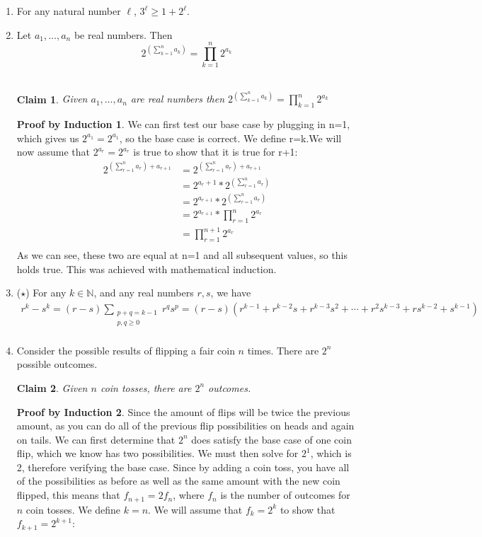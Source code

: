 \documentclass[11pt]{letter}
\newtheorem{claim}{Claim}
\theoremstyle{definition}
\newtheorem{PBI}{Proof by Induction}
\begin{document}
\begin{description}
\begin{enumerate}
			\item For any natural number $\ell$, $3^\ell\geq 1+2^\ell$.
			\item Let $a_1,\ldots, a_n$ be real numbers. Then
				$$2^{\left(\sum_{k=1}^n a_k\right)}=\prod_{k=1}^n 2^{a_k}$$ \\
\begin{claim}
Given $a_1,\ldots, a_n$ are real numbers then $2^{\left(\sum_{k=1}^n a_k\right)}=\prod_{k=1}^n 2^{a_k}$ \\
\end{claim}
\begin{PBI}
We can first test our base case by plugging in n=1, which gives us $2^{a_1}=2^{a_1}$, so the base case is correct. We define r=k.We will now assume that $2^{a_r}=2^{a_r}$ is true to show that it is true for r+1:\\
\begin{align*}
2^{\left(\sum_{r=1}^n a_{r}\right) +a_{r+1}} &=2^{\left(\sum_{r=1}^n a_{r}\right) +a_{r+1}} \tag{replaces k with r+1} \\
&=2^{a_r+1}*2^{\left(\sum_{r=1}^n a_{r}\right)} \\
&=2^{a_{r+1}}*2^{\left(\sum_{r=1}^n a_{r}\right)} \tag{Substituted using inductive assumption}\\
&=2^{a_{r+1}}*\prod_{r=1}^n 2^{a_r} \\
&=\prod_{r=1}^{n+1} 2^{a_r} \\
\end{align*}
As we can see, these two are equal at n=1 and all subsequent values, so this holds true. This was achieved with mathematical induction. \\
\end{PBI}
			\item ($\star$) For any $k\in\mathbb{N}$, and any real numbers $r,s$, we have 
				\begin{align*}
					r^k-s^k=(r-s)\sum_{\substack{p+q=k-1\\p,q\geq 0}} r^qs^p=(r-s)\left(r^{k-1}+r^{k-2}s+r^{k-3}s^2+\cdots+r^2s^{k-3}+rs^{k-2}+s^{k-1}\right) \\
				\end{align*}
			\item Consider the possible results of flipping a fair coin $n$ times. There are $2^n$ possible outcomes. 
\begin{claim}
Given $n$ coin tosses, there are $2^n$ outcomes.
\end{claim}
\begin{PBI}
Since the amount of flips will be twice the previous amount, as you can do all of the previous flip possibilities on heads and again on tails. We can first determine that $2^n$ does satisfy the base case of one coin flip, which we know has two possibilities. We must then solve for $2^1$, which is 2, therefore verifying the base case. Since by adding a coin toss, you have all of the possibilities as before as well as the same amount with the new coin flipped, this means that $f_{n+1}=2f_n$, where $f_n$ is the number of outcomes for $n$ coin tosses. We define $k=n$. We will assume that $f_{k}=2^k$ to show that $f_{k+1}=2^{k+1}$:\\

\end{PBI}
\end{enumerate}
\end{description}
\end{document}

